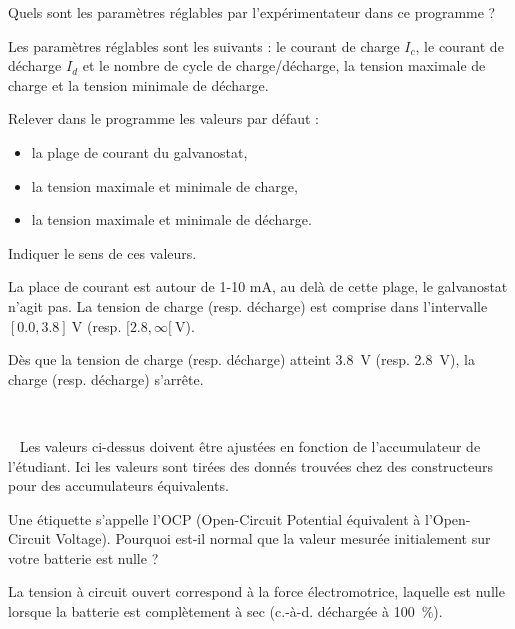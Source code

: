 \documentclass[twoside,a4paper,11pt,addpoints]{exam}%
\newcounter{foo} %
\begin{document}
\begin{questions}
\setcounter{question}{\thefoo}

\question[\half] Quels sont les paramètres réglables par l'expérimentateur dans ce programme ?

\begin{mybox}
\begin{solution}[1cm]
Les paramètres réglables sont les suivants : le courant de charge $I_c$, le courant de décharge $I_d$ et le nombre de cycle de charge/décharge, la tension maximale de charge et la tension minimale de décharge.
\end{solution}\end{mybox}

\question[1] Relever dans le programme les valeurs par défaut :
\begin{itemize}
    \item la plage de courant du galvanostat,
    \item la tension maximale et minimale de charge,
    \item la tension maximale et minimale de décharge.
\end{itemize}
Indiquer le sens de ces valeurs.

\begin{mybox}
\begin{solution}[2cm]
La place de courant est autour de 1-10 \si{\milli\ampere}, au delà de cette plage, le galvanostat n'agit pas. La tension de charge (resp. décharge) est comprise dans l'intervalle $[0.0, 3.8] ~ \si{\volt}$  (resp. $[2.8, \infty [ ~ \si{\volt}$).

Dès que la tension de charge (resp. décharge) atteint \SI{3.8}{\volt} (resp. \SI{2.8}{\volt}), la charge (resp. décharge) s'arrête.

~

\faWarning ~ Les valeurs ci-dessus doivent être ajustées en fonction de l'accumulateur de l'étudiant. Ici les valeurs sont tirées des donnés trouvées chez des constructeurs pour des accumulateurs équivalents.

\end{solution}\end{mybox}

\question[\half] Une étiquette s'appelle l'OCP (Open-Circuit Potential équivalent à l'Open-Circuit Voltage). Pourquoi est-il normal que la valeur mesurée initialement sur votre batterie est nulle ?

\begin{mybox}
\begin{solution}[2cm]
La tension à circuit ouvert correspond à la force électromotrice, laquelle est nulle lorsque la batterie est complètement à sec (c.-à-d. déchargée à \SI{100}{\percent}).


\end{solution}
\end{mybox}
\end{questions}
\end{document}
